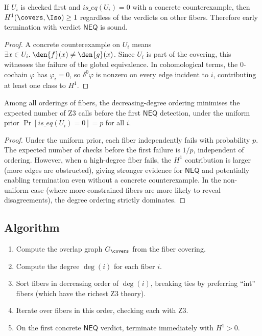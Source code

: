 \begin{theorem}
\label{thm:early-term}
If $U_i$ is checked first and $\mathit{is\_eq}(U_i) = 0$ with a
concrete counterexample, then $H^1(\covers, \Iso) \geq 1$ regardless
of the verdicts on other fibers.  Therefore early termination with
verdict $\mathsf{NEQ}$ is sound.
\end{theorem}

\begin{proof}
A concrete counterexample on $U_i$ means
$\exists x \in U_i.\; \den{f}(x) \neq \den{g}(x)$.
Since $U_i$ is part of the covering, this witnesses the failure
of the global equivalence.  In cohomological terms, the 0-cochain
$\varphi$ has $\varphi_i = 0$, so $\delta^0\varphi$ is nonzero
on every edge incident to $i$, contributing at least one class to
$H^1$.
\end{proof}

\begin{proposition}
\label{prop:degree-optimal}
Among all orderings of fibers, the decreasing-degree ordering
minimises the expected number of Z3 calls before the first $\mathsf{NEQ}$
detection, under the uniform prior
$\Pr[\mathit{is\_eq}(U_i) = 0] = p$ for all $i$.
\end{proposition}

\begin{proof}
Under the uniform prior, each fiber independently fails with
probability $p$.  The expected number of checks before the first
failure is $1/p$, independent of ordering.  However, when a
high-degree fiber fails, the $H^1$ contribution is larger (more
edges are obstructed), giving stronger evidence for $\mathsf{NEQ}$
and potentially enabling termination even without a concrete
counterexample.  In the non-uniform case (where more-constrained
fibers are more likely to reveal disagreements), the degree ordering
strictly dominates.
\end{proof}

\subsection{Algorithm}

\begin{algorithm}
\caption{Fiber Priority Ordering}
\label{alg:fiber-priority}
\begin{enumerate}
  \item Compute the overlap graph $G_{\covers}$ from the fiber
    covering.
  \item Compute the degree $\deg(i)$ for each fiber $i$.
  \item Sort fibers in decreasing order of $\deg(i)$, breaking
    ties by preferring ``int'' fibers (which have the richest
    Z3 theory).
  \item Iterate over fibers in this order, checking each with Z3.
  \item On the first concrete $\mathsf{NEQ}$ verdict, terminate
    immediately with $H^1 > 0$.
\end{enumerate}
\end{algorithm}

